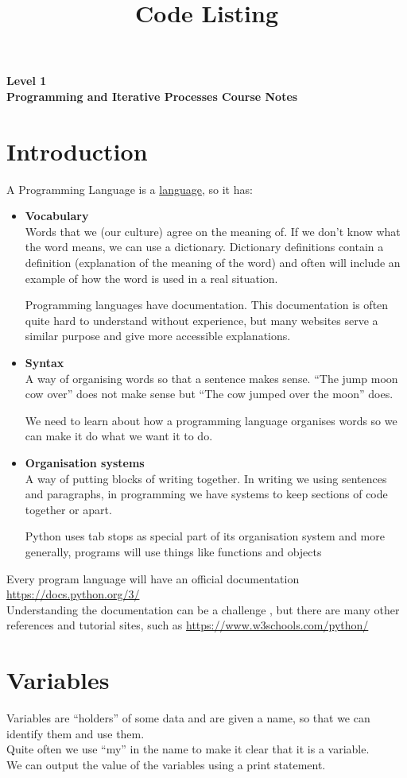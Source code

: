 \documentclass[a4paper,12pt]{article}
\title{Code Listing}
\date{ }
\begin{document}
	\Large
	\textbf{Level 1 }\\
	\textbf{Programming and Iterative Processes Course Notes }
	\normalsize
	\tableofcontents
\newpage
\section{Introduction}
A Programming Language is a \underline{language}, so it has:
\begin{itemize}
\item \textbf{Vocabulary}\\
	Words that we (our culture) agree on the meaning of.
If we don’t know what the word means, we can use a dictionary.
Dictionary definitions contain a definition (explanation of the meaning of the word) and often will include an example of how the word is used in a real situation.



Programming languages have documentation. This documentation is often quite hard to understand without experience, but many websites serve a similar purpose and give more accessible explanations.
\item \textbf{Syntax}\\
	A way of organising words so that a sentence makes sense.
“The jump moon cow over” does not make sense but “The cow jumped over the moon” does.

We need to learn about how a programming language organises words so we can make it do what we want it to do.
\item	\textbf{Organisation systems}\\
	A way of putting blocks of writing together.
In writing we using sentences and paragraphs, in programming we have systems to keep sections of code together or apart.

Python uses tab stops as special part of its organisation system and more generally, programs will use things like functions and objects
\end{itemize}
Every program language will have an official documentation \url{https://docs.python.org/3/}\\
Understanding the documentation can be a challenge , but there are many other references and tutorial sites, such as \url{https://www.w3schools.com/python/}

\newpage
\section{Variables}
Variables are “holders” of some data and are given a name, so that we can identify them and use them.\\
Quite often we use “my” in the name to make it clear that it is a variable.\\
We can output the value of the variables using a print statement.

\end{document}
